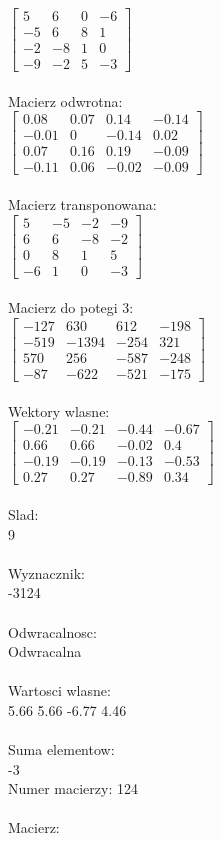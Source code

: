 \documentclass[a4paper,12pt]{article}
\begin{document}
$\begin{bmatrix} 5&6&0&-6\\-5&6&8&1\\-2&-8&1&0\\-9&-2&5&-3 \end{bmatrix}$
\\
\\
Macierz odwrotna:\\

$\begin{bmatrix} 0.08&0.07&0.14&-0.14\\-0.01&0&-0.14&0.02\\0.07&0.16&0.19&-0.09\\-0.11&0.06&-0.02&-0.09 \end{bmatrix}$
\\
\\
Macierz transponowana:\\

$\begin{bmatrix} 5&-5&-2&-9\\6&6&-8&-2\\0&8&1&5\\-6&1&0&-3 \end{bmatrix}$
\\
\\
Macierz do potegi 3:\\

$\begin{bmatrix} -127&630&612&-198\\-519&-1394&-254&321\\570&256&-587&-248\\-87&-622&-521&-175 \end{bmatrix}$
\\
\\
Wektory wlasne:\\

$\begin{bmatrix} -0.21&-0.21&-0.44&-0.67\\0.66&0.66&-0.02&0.4\\-0.19&-0.19&-0.13&-0.53\\0.27&0.27&-0.89&0.34 \end{bmatrix}$
\\
\\
Slad:\\
9
\\
\\
Wyznacznik:\\
-3124
\\
\\
Odwracalnosc:\\
Odwracalna
\\
\\
Wartosci wlasne:\\
5.66 5.66 -6.77 4.46
\\
\\
Suma elementow:\\
-3
\\
\newpage
Numer macierzy:
124
\\
\\
Macierz:\\
\end{document}
